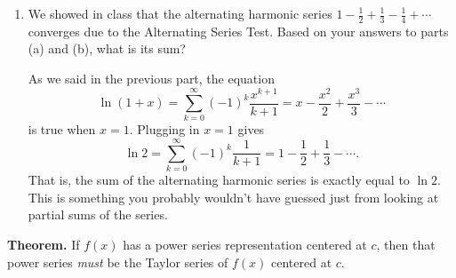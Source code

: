 \documentclass[main]{subfiles}
\begin{document}
\begin{enumerate}
\begin{enumerate}
\begin{solution}
    Since we know the radius of convergence is 1, we know that the
    series converges when $|x| < 1$ and diverges when $|x| > 1$.  We
    only need to see what happens when $x = \pm 1$.  In fact, we
    already did this during the lesson on the Ratio Test, where we
    found that the interval of convergence is \fbox{$(-1, 1]$}.

    As a result, the equation
    \[ \ln(1 + x) = \sum_{k=0}^\infty (-1)^k \frac{x^{k + 1}}{k + 1} = x
    - \frac{x^2}{2} + \frac{x^3}{3} - \cdots\] that we found in
    {{\#4}(a)} is also valid for $x = 1$.  (This is true
    by a different theorem, called the Abel Limit Theorem.)  
    \end{solution}

    \item 
    \begin{problem}[\vfill]
    We showed in class that the alternating
    harmonic series $\displaystyle 1 - \frac{1}{2} + \frac{1}{3} -
    \frac{1}{4} + \cdots$ converges due to the Alternating Series Test.  Based on your answers to parts (a) and (b), what is its sum?
    \end{problem}

    \begin{solution}
    As we said in the previous part, the equation
    \[ \ln(1 + x) = \sum_{k=0}^\infty (-1)^k \frac{x^{k + 1}}{k + 1} = x
    - \frac{x^2}{2} + \frac{x^3}{3} - \cdots\] is true when $x = 1$.
    Plugging in $x = 1$ gives 
    \[ \ln 2 = \sum_{k=0}^\infty (-1)^k \frac{1}{k + 1} = 1 -
    \frac{1}{2} + \frac{1}{3} - \cdots.\]
    That is, the sum of the alternating harmonic series is exactly equal to $\boxed{\ln
    2}$.  This is something you probably wouldn't have guessed just
    from looking at partial sums of the series.
    \end{solution}
    
  \end{enumerate}

\end{enumerate}

\begin{problemonly} 
\begin{framed}
\textbf{Theorem.} If $f(x)$ has a power series representation centered
at $c$, then that power series \textit{must} be the Taylor
series of $f(x)$ centered at $c$.
\end{framed}
\end{problemonly}
\pspace{\newpage}
\end{document}
